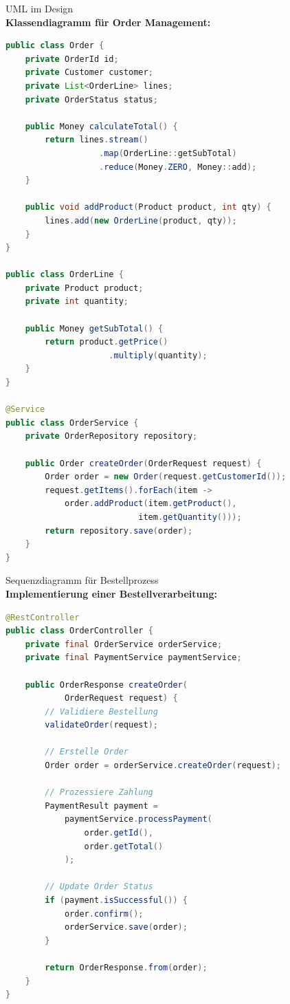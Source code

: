 \begin{example2}{UML im Design}\\
\textbf{Klassendiagramm für Order Management:}

\begin{lstlisting}[language=Java, style=basesmol]
public class Order {
    private OrderId id;
    private Customer customer;
    private List<OrderLine> lines;
    private OrderStatus status;
    
    public Money calculateTotal() {
        return lines.stream()
                   .map(OrderLine::getSubTotal)
                   .reduce(Money.ZERO, Money::add);
    }
    
    public void addProduct(Product product, int qty) {
        lines.add(new OrderLine(product, qty));
    }
}

public class OrderLine {
    private Product product;
    private int quantity;
    
    public Money getSubTotal() {
        return product.getPrice()
                     .multiply(quantity);
    }
}

@Service
public class OrderService {
    private OrderRepository repository;
    
    public Order createOrder(OrderRequest request) {
        Order order = new Order(request.getCustomerId());
        request.getItems().forEach(item -> 
            order.addProduct(item.getProduct(), 
                           item.getQuantity()));
        return repository.save(order);
    }
}
\end{lstlisting}
\end{example2}

\begin{example2}{Sequenzdiagramm für Bestellprozess}\\
\textbf{Implementierung einer Bestellverarbeitung:}

\begin{lstlisting}[language=Java, style=basesmol]
@RestController
public class OrderController {
    private final OrderService orderService;
    private final PaymentService paymentService;
    
    public OrderResponse createOrder(
            OrderRequest request) {
        // Validiere Bestellung
        validateOrder(request);
        
        // Erstelle Order
        Order order = orderService.createOrder(request);
        
        // Prozessiere Zahlung
        PaymentResult payment = 
            paymentService.processPayment(
                order.getId(), 
                order.getTotal()
            );
        
        // Update Order Status
        if (payment.isSuccessful()) {
            order.confirm();
            orderService.save(order);
        }
        
        return OrderResponse.from(order);
    }
}
\end{lstlisting}
\end{example2}

